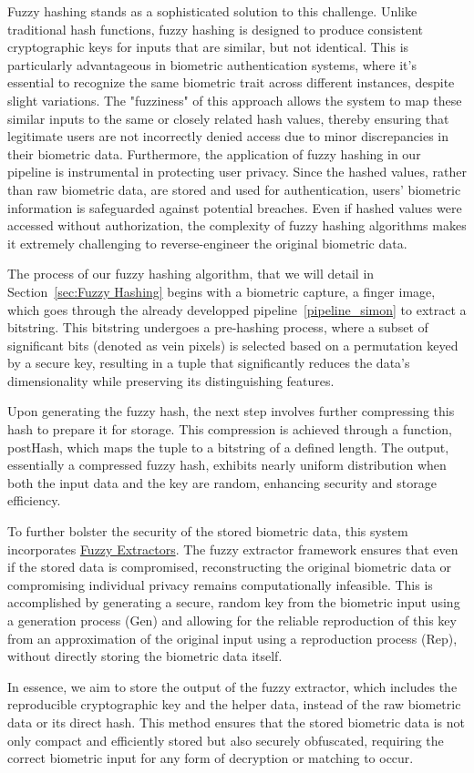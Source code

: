Fuzzy hashing stands as a sophisticated solution to this challenge. Unlike traditional hash functions, fuzzy hashing is designed to produce consistent cryptographic keys for inputs that are similar, but not identical. This is particularly advantageous in biometric authentication systems, where it's essential to recognize the same biometric trait across different instances, despite slight variations. The "fuzziness" of this approach allows the system to map these similar inputs to the same or closely related hash values, thereby ensuring that legitimate users are not incorrectly denied access due to minor discrepancies in their biometric data.
Furthermore, the application of fuzzy hashing in our pipeline is instrumental in protecting user privacy. Since the hashed values, rather than raw biometric data, are stored and used for authentication, users' biometric information is safeguarded against potential breaches. Even if hashed values were accessed without authorization, the complexity of fuzzy hashing algorithms makes it extremely challenging to reverse-engineer the original biometric data.

The process of our fuzzy hashing algorithm, that we will detail in Section~\ref{sec:Fuzzy Hashing}  begins with a biometric capture, a finger image, which goes through the already developped pipeline~\ref{pipeline_simon} to extract a bitstring. This bitstring undergoes a pre-hashing process, where a subset of significant bits (denoted as vein pixels) is selected based on a permutation keyed by a secure key, resulting in a tuple that significantly reduces the data's dimensionality while preserving its distinguishing features.

Upon generating the fuzzy hash, the next step involves further compressing this hash to prepare it for storage. This compression is achieved through a function, postHash, which maps the tuple to a bitstring of a defined length. The output, essentially a compressed fuzzy hash, exhibits nearly uniform distribution when both the input data and the key are random, enhancing security and storage efficiency.

To further bolster the security of the stored biometric data, this system incorporates \hyperref[def:Fuzzy_Extractors]{Fuzzy Extractors}. The fuzzy extractor framework ensures that even if the stored data is compromised, reconstructing the original biometric data or compromising individual privacy remains computationally infeasible. This is accomplished by generating a secure, random key from the biometric input using a generation process (Gen) and allowing for the reliable reproduction of this key from an approximation of the original input using a reproduction process (Rep), without directly storing the biometric data itself.

In essence, we aim to store the output of the fuzzy extractor, which includes the reproducible cryptographic key and the helper data, instead of the raw biometric data or its direct hash. This method ensures that the stored biometric data is not only compact and efficiently stored but also securely obfuscated, requiring the correct biometric input for any form of decryption or matching to occur.

